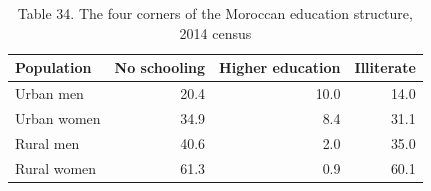 \begin{table}
\caption{Table 34. The four corners of the Moroccan education structure, 2014 census}
\label{tab:T34_four_corners}
\begin{tabular}{lrrr}
\toprule
Population & No schooling & Higher education & Illiterate \\
\midrule
Urban men & 20.4 & 10.0 & 14.0 \\
Urban women & 34.9 & 8.4 & 31.1 \\
Rural men & 40.6 & 2.0 & 35.0 \\
Rural women & 61.3 & 0.9 & 60.1 \\
\bottomrule
\end{tabular}
\end{table}
